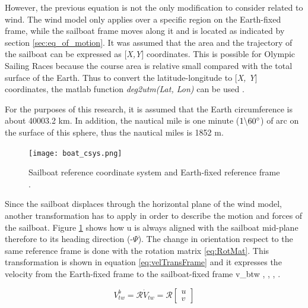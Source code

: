 However, the previous equation is not the only modification to consider related to wind. %
The wind model only applies over a specific region on the Earth-fixed frame, while the sailboat frame moves along it and is located as indicated by section \ref{sec:eq_of_motion}. It was assumed that the area and the trajectory of the sailboat can be expressed as [\textit{X,Y}] coordinates. This is possible for Olympic Sailing Races because the course area is relative small compared with the total surface of the Earth. Thus to convert the latitude-longitude to [\textit{X, Y}] coordinates, the \acrshort{matlab} function \textit{deg2utm(Lat, Lon)} can be used \cite{allsopp1998stochastic}.\par 
\noindent For the purposes of this research, it is assumed that the Earth circumference is about 40003.2 km. In addition, the nautical mile is one minute (\textit{$1 \backslash 60 \degree$}) of arc on the surface of this sphere, thus the nautical miles is 1852 m. \par 
\begin{figure}[hbt!]
    \centering
    \texttt{[image: boat\_csys.png]}
    \caption{Sailboat reference coordinate system and Earth-fixed reference frame \cite{keuning2004mathematical}. }
    \label{fig:boat_Csys}
\end{figure}
Since the sailboat displaces through the horizontal plane of the wind model, another transformation has to apply in order to describe the motion and forces of the sailboat. Figure \ref{fig:boat_Csys} shows how \acrshort{u} is always aligned with the sailboat mid-plane therefore to its heading direction (-$\Psi$). The change in orientation respect to the same reference frame is done with the rotation matrix \ref{eq:RotMat}. This transformation is shown in equation \ref{eq:velTransFrame} and it expresses the velocity from the Earth-fixed frame to the sailboat-fixed frame \acrshort{v_btw} \cite{yang2011control}, \cite{bohm2014velocity}, \cite{Alves2014ASailboat}, \cite{keuning2004mathematical}.\par 
\begin{equation}\label{eq:velTransFrame}
    V_{tw}^b= \mathcal{R} \dot V_{tw}= \mathcal{R}
    \begin{bmatrix}
    u\\
    v
    \end{bmatrix}
\end{equation}

